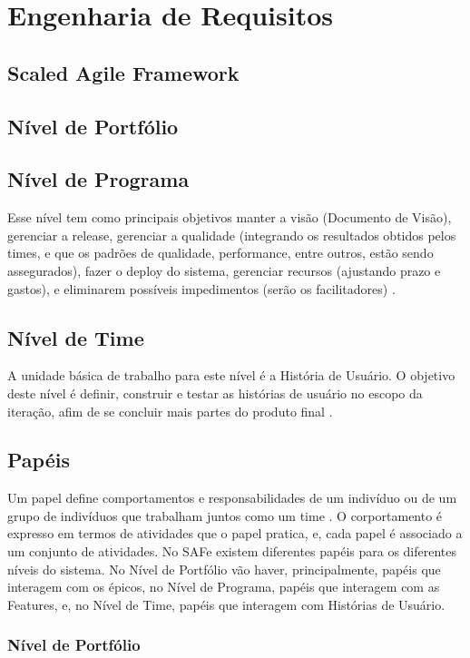 \chapter[Engenharia de Requisitos]{Engenharia de Requisitos}

\section{Scaled Agile Framework}
\section{Nível de Portfólio}
\section{Nível de Programa}
Esse nível tem como principais objetivos manter a visão (Documento de Visão), gerenciar a release, gerenciar a qualidade (integrando os resultados obtidos pelos times, e que os padrões de qualidade, performance, entre outros, estão sendo assegurados), fazer o deploy do sistema, gerenciar recursos (ajustando prazo e gastos), e eliminarem possíveis impedimentos (serão os facilitadores) \cite{safe002}.



\section{Nível de Time}
A unidade básica de trabalho para este nível é a História de Usuário. O objetivo deste nível é definir, construir e testar as histórias de usuário no escopo da iteração, afim de se concluir mais partes do produto final \cite{safe001}.

\section{Papéis}
Um papel define comportamentos e responsabilidades de um indivíduo ou de um grupo de indivíduos que trabalham juntos como um time \cite{kruchten002}. O corportamento é expresso em termos de atividades que o papel pratica, e, cada papel é associado a um conjunto de atividades. No SAFe existem diferentes papéis para os diferentes níveis do sistema. No Nível de Portfólio vão haver, principalmente, papéis que interagem com os épicos, no Nível de Programa, papéis que interagem com as Features, e, no Nível de Time, papéis que interagem com Histórias de Usuário.

\subsection{Nível de Portfólio}
